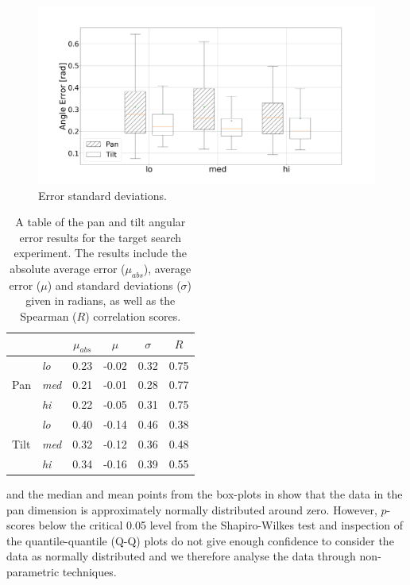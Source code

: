 \documentclass[sigconf, review=true, screen=true, anonymous=true]{acmart}
\begin{document}
\begin{figure}
  \centering
  \includegraphics[clip, trim=80 -70 100 0, width=0.8\columnwidth]{figures/err_boxplot_std.png}
  \caption{Error standard deviations.}\label{fig:err-boxplot-std}
\end{figure}

\begin{table}
  \centering
  \caption{A table of the pan and tilt angular error results for the target search experiment. The results include the absolute average error ($\mu_{abs}$), average error ($\mu$) and standard deviations ($\sigma$) given in radians, as well as the Spearman ($R$) correlation scores.}\label{tab:results}
  \begin{tabular}{llcccc}
    \toprule
    \multicolumn{2}{c}{} & $\mu_{abs}$ & $\mu$ & $\sigma$ & $R$ \\\midrule
    & \emph{lo}  & 0.23 & -0.02 & 0.32 & 0.75 \\%
    Pan & \emph{med} & 0.21 & -0.01 & 0.28 & 0.77 \\%
    & \emph{hi}  & 0.22 & -0.05 & 0.31 & 0.75 \\\midrule
    & \emph{lo}  & 0.40 & -0.14 & 0.46 & 0.38 \\%
    Tilt & \emph{med} & 0.32 & -0.12 & 0.36 & 0.48 \\%
    & \emph{hi}  & 0.34 & -0.16 & 0.39 & 0.55 \\
    \bottomrule
  \end{tabular}
\end{table}

 and the median and mean points from the box-plots in  show that the data in the pan dimension is approximately normally distributed around zero.
However, $p$-scores below the critical 0.05 level from the Shapiro-Wilkes test and inspection of the quantile-quantile (Q-Q) plots do not give enough confidence to consider the data as normally distributed and we therefore analyse the data through non-parametric techniques. 
\end{document}
